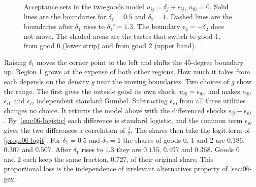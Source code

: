 \begin{figure}[htbp]
\centering
{}
\caption{Acceptance sets in the two-goods model $u_{ij} = \delta_j + \epsilon_{ij}$, $u_{i0} = 0$. Solid lines are
the boundaries for $\delta_1 = 0.5$ and $\delta_2 = 1$. Dashed lines are the boundaries after $\delta_1$ rises to
$\delta_1' = 1.3$. The boundary $\epsilon_2 = -\delta_2$ does not move. The shaded areas are the tastes that
switch to good 1, from good 0 (lower strip) and from good 2 (upper band).}
\label{fig:06-twogoods}
\end{figure}

Raising $\delta_1$ moves the corner point to the left and shifts the $45$-degree boundary up. Region 1 grows at
the expense of both other regions. How much it takes from each depends on the density $g$ near the moving
boundaries. Two choices of $g$ show the range. The first gives the outside good its own shock, $u_{i0} = \epsilon_{i0}$,
and makes $\epsilon_{i0}$, $\epsilon_{i1}$ and $\epsilon_{i2}$ independent standard Gumbel. Subtracting $\epsilon_{i0}$
from all three utilities changes no choice. It returns the model above with the differenced shocks
$\epsilon_{ij} - \epsilon_{i0}$. By \cref{lem:06-logistic} each difference is standard logistic, and the common term
$\epsilon_{i0}$ gives the two differences a correlation of $\frac{1}{2}$. The shares then take the logit form of
\cref{prop:06-logit}. For $\delta_1 = 0.5$ and $\delta_2 = 1$ the shares of goods 0, 1 and 2 are $0.186$,
$0.307$ and $0.507$. After $\delta_1$ rises to $1.3$ they are $0.135$, $0.497$ and $0.368$. Goods 0 and 2 each
keep the same fraction, $0.727$, of their original share. This proportional loss is the independence of
irrelevant alternatives property of \cref{sec:06-gev}.

